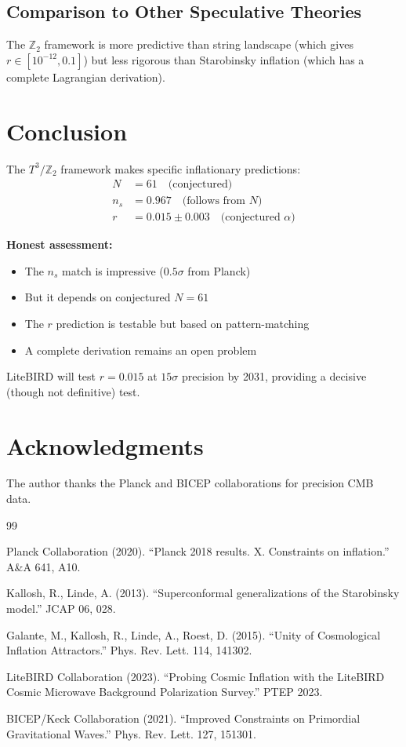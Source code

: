 \documentclass[12pt,a4paper]{article}
\begin{document}
\subsection{Comparison to Other Speculative Theories}

The $\mathbb{Z}_2$ framework is more predictive than string landscape (which gives $r \in [10^{-12}, 0.1]$) but less rigorous than Starobinsky inflation (which has a complete Lagrangian derivation).

\section{Conclusion}

The $T^3/\mathbb{Z}_2$ framework makes specific inflationary predictions:
\begin{align}
N &= 61 \quad \text{(conjectured)} \\
n_s &= 0.967 \quad \text{(follows from $N$)} \\
r &= 0.015 \pm 0.003 \quad \text{(conjectured $\alpha$)}
\end{align}

\textbf{Honest assessment:}
\begin{itemize}
    \item The $n_s$ match is impressive ($0.5\sigma$ from Planck)
    \item But it depends on conjectured $N = 61$
    \item The $r$ prediction is testable but based on pattern-matching
    \item A complete derivation remains an open problem
\end{itemize}

LiteBIRD will test $r = 0.015$ at $15\sigma$ precision by 2031, providing a decisive (though not definitive) test.

\section*{Acknowledgments}

The author thanks the Planck and BICEP collaborations for precision CMB data.

\begin{thebibliography}{99}

Planck Collaboration (2020). ``Planck 2018 results. X. Constraints on inflation.'' A\&A 641, A10.

Kallosh, R., Linde, A. (2013). ``Superconformal generalizations of the Starobinsky model.'' JCAP 06, 028.

Galante, M., Kallosh, R., Linde, A., Roest, D. (2015). ``Unity of Cosmological Inflation Attractors.'' Phys. Rev. Lett. 114, 141302.

LiteBIRD Collaboration (2023). ``Probing Cosmic Inflation with the LiteBIRD Cosmic Microwave Background Polarization Survey.'' PTEP 2023.

BICEP/Keck Collaboration (2021). ``Improved Constraints on Primordial Gravitational Waves.'' Phys. Rev. Lett. 127, 151301.

\end{thebibliography}
\end{document}

